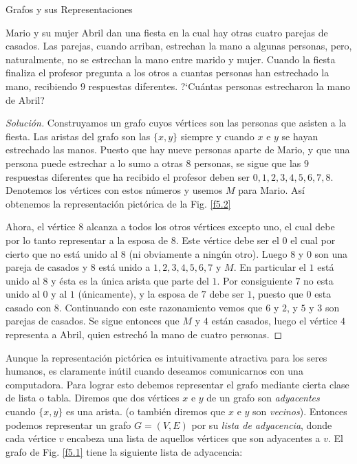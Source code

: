 \begin{section}{Grafos y sus Representaciones}
\begin{ejemplo} Mario y su mujer Abril dan una
fiesta en la cual hay otras cuatro parejas de casados. Las
parejas, cuando arriban, estrechan la mano a algunas personas,
pero, naturalmente, no se estrechan la mano entre marido y mujer.
Cuando la fiesta finaliza el profesor pregunta a los otros a
cuantas personas han estrechado la mano, recibiendo $9$ respuestas
diferentes. ?`Cuántas personas estrecharon la mano de Abril?
\end{ejemplo}
\begin{proof}[Solución] Construyamos un grafo cuyos vértices son las personas que asisten a la
fiesta. Las aristas del grafo son las  $\{x,y\}$ siempre y cuando $x$ e $y$ se
hayan estrechado las manos. Puesto que hay nueve personas aparte
de Mario, y que una persona puede estrechar a lo sumo
a otras $8$ personas, se sigue que las $9$ respuestas diferentes que
ha recibido el profesor deben ser $0, 1, 2, 3, 4, 5, 6, 7, 8.$
Denotemos los vértices con estos números y usemos $M$ para Mario. Así obtenemos la representación pictórica de la Fig. \ref{f5.2}


Ahora, el vértice $8$ alcanza a todos los otros vértices excepto
uno, el cual debe por lo tanto representar a la esposa de $8$. Este
vértice debe ser el $0$ el cual por cierto que no está unido al $8$
(ni ob\-via\-men\-te a ningún otro). Luego $8$ y $0$ son una pareja de
casados y $8$ está unido a $1, 2, 3, 4, 5, 6, 7$ y $M$. En particular
el $1$ está unido al $8$ y ésta es la única arista que parte del $1$.
Por consiguiente $7$ no esta unido al $0$ y al $1$ (únicamente), y la
esposa de $7$ debe ser $1$, puesto que $0$ esta casado con $8$.
Continuando con este razonamiento vemos que $6$ y $2$, y $5$ y $3$ son
parejas de casados. Se sigue entonces que $M$ y $4$ están casados,
luego el vértice $4$ representa a Abril, quien estrechó la mano de
cuatro personas.
\end{proof}



Aunque la representación pictórica es intuitivamente atractiva
para los seres humanos, es claramente inútil cuando deseamos
comunicarnos con una computadora. Para lograr esto debemos
re\-pre\-sen\-tar el grafo mediante cierta clase de lista o tabla.
Diremos que dos vértices $x$ e $y$ de un grafo son {\em
adyacentes} cuando $\{x,y\}$ es una arista.
(o también diremos que $x$ e $y$ son {\em vecinos}).  Entonces
podemos representar un grafo $G=(V,E)$ por su {\em lista de
adyacencia},   donde cada vértice $v$
encabeza una lista de aquellos vértices que son adyacentes a $v$.
El grafo de Fig. \ref{f5.1} tiene la siguiente lista de
adyacencia:


\end{section}
